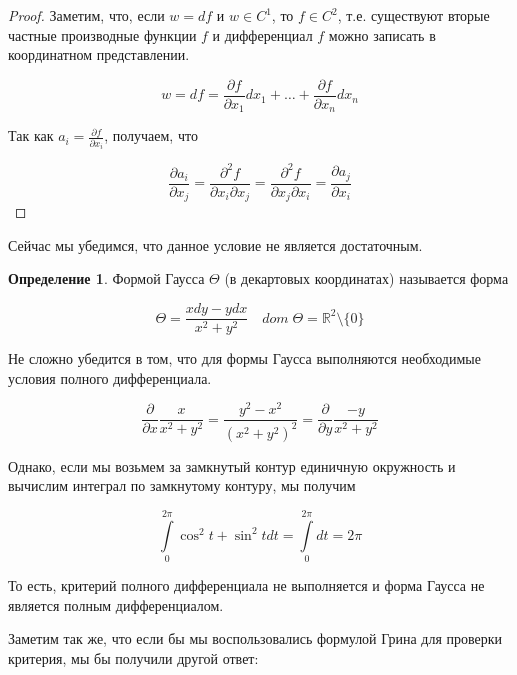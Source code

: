 \documentclass[a5paper]{article}
\newcounter{through}
\theoremstyle{plain}
\theoremstyle{definition}
\newtheorem{definition}[through]{Определение}
\numberwithin{through}{section}
\numberwithin{equation}{section}
\begin{document}
\begin{proof}
	Заметим, что, если $w = df$ и $w \in C^1$, то $f \in C^2$, т.е. существуют вторые частные производные функции $f$ и дифференциал $f$ можно записать в координатном представлении.
	
	\begin{equation*}
		w = df = \frac{\partial f}{\partial x_1} dx_1 + \ldots + \frac{\partial f}{\partial x_n} dx_n
	\end{equation*}
	
	Так как $a_i = \frac{\partial f}{\partial x_i}$, получаем, что
	
	\begin{equation*}
		\frac{\partial a_i}{\partial x_j} = \frac{\partial^2 f}{\partial x_i \partial x_j} = \frac{\partial^2 f}{\partial x_j \partial x_i} = \frac{\partial a_j}{\partial x_i}
	\end{equation*}
\end{proof}

Сейчас мы убедимся, что данное условие не является достаточным.

\begin{definition}
	Формой Гаусса $\Theta$ (в декартовых координатах) называется форма
	
	\begin{equation*}
		\Theta = \frac{xdy - ydx}{x^2 + y^2} \quad dom \; \Theta = \mathbb{R}^2 \setminus \{0\}
	\end{equation*}	
\end{definition}

Не сложно убедится в том, что для формы Гаусса выполняются необходимые условия полного дифференциала.

\begin{equation*}
	\frac{\partial}{\partial x} \frac{x}{x^2 + y^2} = \frac{y^2 - x^2}{(x^2 + y^2)^2} = \frac{\partial}{\partial y} \frac{-y}{x^2 + y^2}
\end{equation*}

Однако, если мы возьмем за замкнутый контур единичную окружность и вычислим интеграл по замкнутому контуру, мы получим

\begin{equation*}
	\int\limits_{0}^{2 \pi} \cos^2 t+ \sin^2 t dt = \int\limits_{0}^{2 \pi }dt = 2 \pi
\end{equation*}

То есть, критерий полного дифференциала не выполняется и форма Гаусса не является полным дифференциалом.

Заметим так же, что если бы мы воспользовались формулой Грина для проверки критерия, мы бы получили другой ответ:
\end{document}
